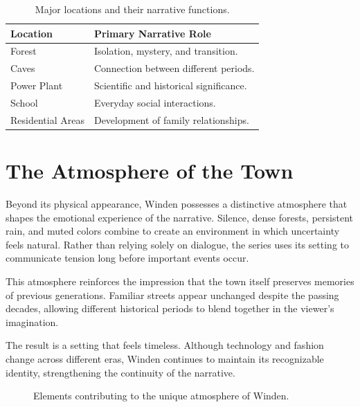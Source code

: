 \documentclass[12pt,oneside,openany]{book}
\begin{document}
\begin{table}[H]
\centering
\begin{tabular}{|p{4cm}|p{8cm}|}
\hline
\textbf{Location} & \textbf{Primary Narrative Role}\\
\hline
Forest & Isolation, mystery, and transition.\\
\hline
Caves & Connection between different periods.\\
\hline
Power Plant & Scientific and historical significance.\\
\hline
School & Everyday social interactions.\\
\hline
Residential Areas & Development of family relationships.\\
\hline
\end{tabular}
\caption{Major locations and their narrative functions.}
\end{table}
\section{The Atmosphere of the Town}

Beyond its physical appearance, Winden possesses a distinctive atmosphere that
shapes the emotional experience of the narrative. Silence, dense forests,
persistent rain, and muted colors combine to create an environment in which
uncertainty feels natural. Rather than relying solely on dialogue, the series
uses its setting to communicate tension long before important events occur.

This atmosphere reinforces the impression that the town itself preserves
memories of previous generations. Familiar streets appear unchanged despite the
passing decades, allowing different historical periods to blend together in the
viewer's imagination.

The result is a setting that feels timeless. Although technology and fashion
change across different eras, Winden continues to maintain its recognizable
identity, strengthening the continuity of the narrative.

\begin{figure}[H]
\centering
{}
\caption{Elements contributing to the unique atmosphere of Winden.}
\end{figure}
\end{document}
